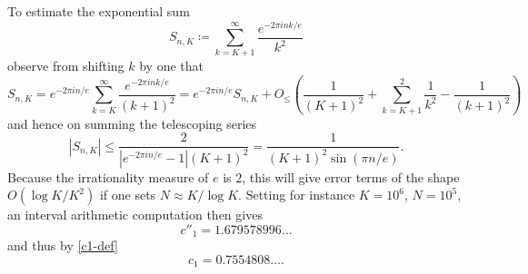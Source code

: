 \documentclass[12pt,a4paper,reqno]{amsart}
\numberwithin{equation}{section}
\theoremstyle{plain}
\theoremstyle{definition}
\begin{document}
To estimate the exponential sum
$$ S_{n,K} \coloneqq \sum_{k=K+1}^\infty \frac{e^{-2\pi i n k/e}}{k^2}$$
observe from shifting $k$ by one that
$$ S_{n,K} = e^{-2\pi i n/e} \sum_{k=K}^\infty \frac{e^{-2\pi i n k/e}}{(k+1)^2}
= e^{-2\pi i n/e} S_{n,K} + O_{\leq}\left( \frac{1}{(K+1)^2} + \sum_{k=K+1}^2 \frac{1}{k^2} -\frac{1}{(k+1)^2}\right)$$
and hence on summing the telescoping series
$$ |S_{n,K}| \leq \frac{2}{|e^{-2\pi i n/e}-1| (K+1)^2} = \frac{1}{(K+1)^2 \sin(\pi n/e)}.$$
Because the irrationality measure of $e$ is $2$, this will give error terms of the shape $O(\log K/K^2)$ if one sets $N \approx K / \log K$.  Setting for instance $K = 10^6$, $N = 10^5$, an interval arithmetic computation then gives
$$c''_1 = 1.679578996\dots$$
and thus by \eqref{c1-def}
$$ c_1 = 0.7554808\dots.$$
\end{document}
